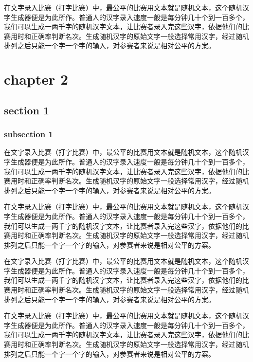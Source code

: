 \documentclass[12pt,hyperref,UTF8]{ctexbook}
\begin{document}
在文字录入比赛（打字比赛）中，最公平的比赛用文本就是随机文本，这个随机汉字生成器便是为此所作。普通人的汉字录入速度一般是每分钟几十个到一百多个，我们可以生成一两千字的随机汉字文本，让比赛者录入完这些汉字，依据他们的比赛用时和正确率判断名次。生成随机汉字的原始文字一般选择常用汉字，经过随机排列之后只能一个字一个字的输入，对参赛者来说是相对公平的方案。


\cleardoublepage
\chapter{chapter 2}

\section{section 1}

\subsection{subsection 1}

在文字录入比赛（打字比赛）中，最公平的比赛用文本就是随机文本，这个随机汉字生成器便是为此所作。普通人的汉字录入速度一般是每分钟几十个到一百多个，我们可以生成一两千字的随机汉字文本，让比赛者录入完这些汉字，依据他们的比赛用时和正确率判断名次。生成随机汉字的原始文字一般选择常用汉字，经过随机排列之后只能一个字一个字的输入，对参赛者来说是相对公平的方案。

在文字录入比赛（打字比赛）中，最公平的比赛用文本就是随机文本，这个随机汉字生成器便是为此所作。普通人的汉字录入速度一般是每分钟几十个到一百多个，我们可以生成一两千字的随机汉字文本，让比赛者录入完这些汉字，依据他们的比赛用时和正确率判断名次。生成随机汉字的原始文字一般选择常用汉字，经过随机排列之后只能一个字一个字的输入，对参赛者来说是相对公平的方案。

在文字录入比赛（打字比赛）中，最公平的比赛用文本就是随机文本，这个随机汉字生成器便是为此所作。普通人的汉字录入速度一般是每分钟几十个到一百多个，我们可以生成一两千字的随机汉字文本，让比赛者录入完这些汉字，依据他们的比赛用时和正确率判断名次。生成随机汉字的原始文字一般选择常用汉字，经过随机排列之后只能一个字一个字的输入，对参赛者来说是相对公平的方案。

在文字录入比赛（打字比赛）中，最公平的比赛用文本就是随机文本，这个随机汉字生成器便是为此所作。普通人的汉字录入速度一般是每分钟几十个到一百多个，我们可以生成一两千字的随机汉字文本，让比赛者录入完这些汉字，依据他们的比赛用时和正确率判断名次。生成随机汉字的原始文字一般选择常用汉字，经过随机排列之后只能一个字一个字的输入，对参赛者来说是相对公平的方案。
\end{document}
